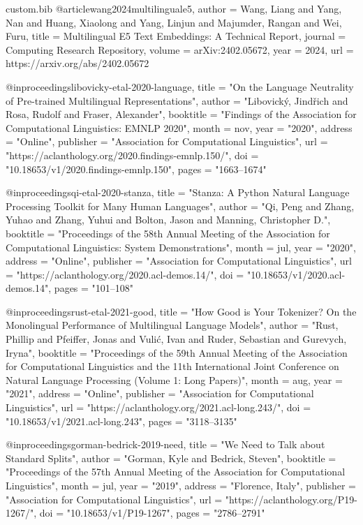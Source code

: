 \begin{filecontents*}[overwrite]{custom.bib}
@article{wang2024multilinguale5,
    author  = {Wang, Liang and Yang, Nan and Huang, Xiaolong and Yang, Linjun and Majumder, Rangan and Wei, Furu},
    title   = {Multilingual {E}5 Text Embeddings: A Technical Report},
    journal = {Computing Research Repository},
    volume  = {arXiv:2402.05672},
    year    = {2024},
    url     = {https://arxiv.org/abs/2402.05672}
}

@inproceedings{libovicky-etal-2020-language,
    title = "On the Language Neutrality of Pre-trained Multilingual Representations",
    author = "Libovick{\'y}, Jind{\v{r}}ich  and
      Rosa, Rudolf  and
      Fraser, Alexander",
    booktitle = "Findings of the Association for Computational Linguistics: {EMNLP} 2020",
    month = nov,
    year = "2020",
    address = "Online",
    publisher = "Association for Computational Linguistics",
    url = "https://aclanthology.org/2020.findings-emnlp.150/",
    doi = "10.18653/v1/2020.findings-emnlp.150",
    pages = "1663--1674"
}

@inproceedings{qi-etal-2020-stanza,
    title     = "{S}tanza: A {P}ython Natural Language Processing Toolkit for Many Human Languages",
    author    = "Qi, Peng  and
      Zhang, Yuhao  and
      Zhang, Yuhui  and
      Bolton, Jason  and
      Manning, Christopher D.",
    booktitle = "Proceedings of the 58th Annual Meeting of the Association for Computational Linguistics: System Demonstrations",
    month     = jul,
    year      = "2020",
    address   = "Online",
    publisher = "Association for Computational Linguistics",
    url       = "https://aclanthology.org/2020.acl-demos.14/",
    doi       = "10.18653/v1/2020.acl-demos.14",
    pages     = "101--108"
}

@inproceedings{rust-etal-2021-good,
    title     = "How Good is Your Tokenizer? On the Monolingual Performance of Multilingual Language Models",
    author    = "Rust, Phillip  and
      Pfeiffer, Jonas  and
      Vuli{\'c}, Ivan  and
      Ruder, Sebastian  and
      Gurevych, Iryna",
    booktitle = "Proceedings of the 59th Annual Meeting of the Association for Computational Linguistics and the 11th International Joint Conference on Natural Language Processing (Volume 1: Long Papers)",
    month     = aug,
    year      = "2021",
    address   = "Online",
    publisher = "Association for Computational Linguistics",
    url       = "https://aclanthology.org/2021.acl-long.243/",
    doi       = "10.18653/v1/2021.acl-long.243",
    pages     = "3118--3135"
}

@inproceedings{gorman-bedrick-2019-need,
    title = "We Need to Talk about Standard Splits",
    author = "Gorman, Kyle  and
      Bedrick, Steven",
    booktitle = "Proceedings of the 57th Annual Meeting of the Association for Computational Linguistics",
    month = jul,
    year = "2019",
    address = "Florence, Italy",
    publisher = "Association for Computational Linguistics",
    url = "https://aclanthology.org/P19-1267/",
    doi = "10.18653/v1/P19-1267",
    pages = "2786--2791"
}


\end{filecontents*}
